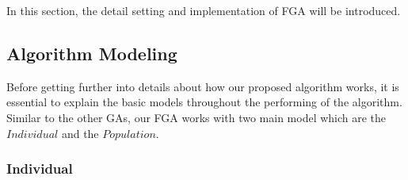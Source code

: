 \documentclass[final]{elsarticle}
\begin{document}
In this section, the detail setting and implementation of FGA will be introduced.

\subsection{Algorithm Modeling}

Before getting further into details about how our proposed algorithm works, it is essential to explain the basic models throughout the performing of the algorithm. Similar to the other GAs, our FGA works with two main model which are the $ Individual $ and the $ Population $.

\subsubsection{Individual}
\end{document}
